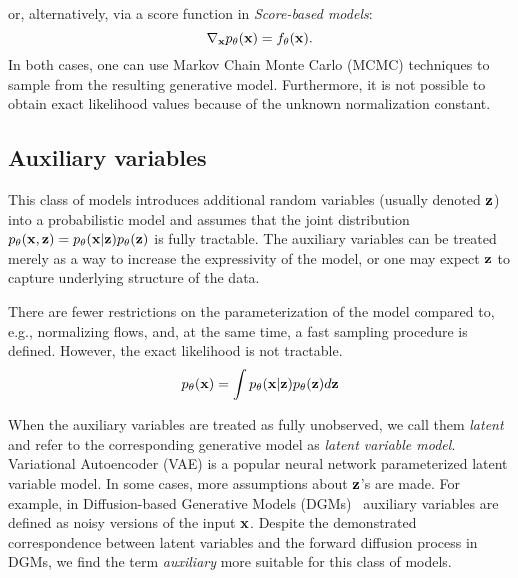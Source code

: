 or, alternatively, via a score function in \textit{Score-based models}:
\begin{equation}\label{eq:intro_score}
    \nabla_{\rvx} p_{\theta}(\rvx) = f_{\theta}(\rvx).
\end{equation}
In both cases, one can use Markov Chain Monte Carlo (MCMC) techniques to sample from the resulting generative model.   Furthermore, it is not possible to obtain exact likelihood values because of the unknown normalization constant. 



\subsection{Auxiliary variables}
This class of models introduces additional random variables (usually denoted ${\mathbf{z}}$) into a probabilistic model and assumes that the joint distribution $p_{\theta}({\mathbf{x}}, {\mathbf{z}}) = p_{\theta}({\mathbf{x}}| {\mathbf{z}})p_{\theta}({\mathbf{z}})$ is fully tractable. The auxiliary variables can be treated merely as a way to increase the expressivity of the model, or one may expect ${\mathbf{z}}$ to capture underlying structure of the data. 

There are fewer restrictions on the parameterization of the model compared to, e.g., normalizing flows, and, at the same time, a fast sampling procedure is defined. However, the exact likelihood is not tractable. 
\begin{equation}\label{eq:intro_lvm_def}
     p_{\theta}(\rvx) = \int  p_{\theta}(\rvx| \rvz)p_{\theta}(\rvz) d\rvz
\end{equation}

When the auxiliary variables are treated as fully unobserved, we call them \textit{latent} and refer to the corresponding generative model as \textit{latent variable model}. 
Variational Autoencoder (VAE) \citep{kingma2014autoencoding, rezende2014stochastic} is a popular neural network parameterized latent variable model. 
In some cases, more assumptions about ${\mathbf{z}}$'s are made. For example, in Diffusion-based Generative Models (DGMs)~\citep{sohl2015deep, ho2020denoising} auxiliary variables are defined as noisy versions of the input ${\mathbf{x}}$. Despite the demonstrated correspondence between latent variables and the forward diffusion process \cite{huang2021variational, kingma2021variational, tzen2019neural} in DGMs, we find the term \textit{auxiliary} more suitable for this class of models. 


